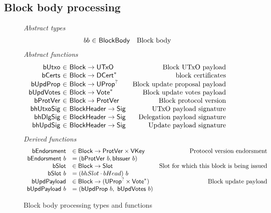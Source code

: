 \documentclass[11pt,a4paper]{article}
\newcommand{\fun}[1]{\mathsf{#1}}
\newcommand{\type}[1]{\mathsf{#1}}
\newcommand{\seqof}[1]{#1^{*}}
\newcommand{\totalf}{\to}
\newcommand{\Slot}{\type{Slot}}
\newcommand{\Block}{\type{Block}}
\newcommand{\DCert}{\type{DCert}}
\newcommand{\VKey}{\type{VKey}}
\newcommand{\Sig}{\type{Sig}}
\newcommand{\bcertsname}{bCerts}
\newcommand{\bissuername}{bIssuer}
\newcommand{\bissuer}[1]{\fun{\bissuername} ~ #1}
\begin{document}
\clearpage

\subsection{Block body processing}
\begin{figure}[ht]
  \emph{Abstract types}
  \begin{equation*}
    \begin{array}{r@{~\in~}lr}
      bb & \Bbody & \text{Block body} \\

    \end{array}
  \end{equation*}
  \emph{Abstract functions}
  \begin{equation*}
    \begin{array}{r@{~\in~}lr}
      \fun{bUtxo} & \Block \totalf \UTxO & \text{Block UTxO payload} \\
      \fun{\bcertsname} & \Block \totalf \seqof{\DCert}
                                         & \text{block certificates} \\
      \fun{bUpdProp} & \Block \totalf \UProp^{?} & \text{Block update proposal payload} \\
      \fun{bUpdVotes} & \Block \totalf \seqof{\Vote} & \text{Block update votes payload} \\
      \fun{bProtVer} & \Block \totalf \ProtVer & \text{Block protocol version} \\
      \fun{bhUtxoSig} & \Bhead \totalf \Sig & \text{UTxO payload signature} \\
      \fun{bhDlgSig} & \Bhead \totalf \Sig & \text{Delegation payload signature} \\
      \fun{bhUpdSig} & \Bhead \totalf \Sig & \text{Update payload signature} \\
    \end{array}
  \end{equation*}
  \emph{Derived functions}
  \begin{equation*}
    \begin{array}{rlr}
      \fun{bEndorsment} & \in \Block \to \ProtVer \times \VKey & \text{Protocol version endorsment} \\
      \bendorsment{b} & = (\bprotver{b}, \bissuer{b}) \\
      \fun{\bslotname} & \in \Block \to \Slot & \text{Slot for which this block is being issued} \\
      \bslot{b} & = (\bhslotname \cdot \bheadname)~b \\
      \fun{\bupdpayloadname} & \in \Block \to (\UProp^{?}\times\seqof{\Vote}) & \text{Block update payload} \\
      \bupdpayload{b} & = (\bupdprop{b},~\bupdvotes{b})
    \end{array}
  \end{equation*}
  \caption{Block body processing types and functions}
  \label{fig:defs:bbody}
\end{figure}
\end{document}
